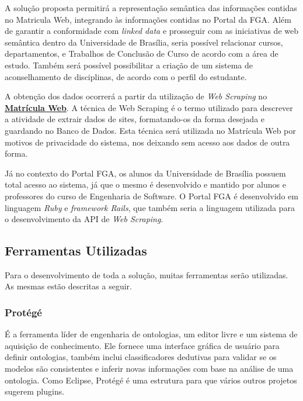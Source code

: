 
A solução proposta permitirá a representação semântica das informações contidas no Matricula Web, integrando às informações contidas no Portal da FGA. Além de garantir a conformidade com \textit{linked data} e prosseguir com as iniciativas de web semântica dentro da Universidade de Brasília, seria possível relacionar cursos, departamentos, e Trabalhos de Conclusão de Curso de acordo com a área de estudo. Também será possível possibilitar a criação de um sistema de aconselhamento de disciplinas, de acordo com o perfil do estudante.

A obtenção dos dados ocorrerá a partir da utilização de \textit{Web Scraping} no \href{http://matriculaweb.unb.br}{\textbf{Matrícula Web}}. A técnica de Web Scraping é o termo utilizado para descrever a atividade de extrair dados de sites, formatando-os da forma desejada e guardando no Banco de Dados. Esta técnica será utilizada no Matrícula Web por motivos de privacidade do sistema, nos deixando sem acesso aos dados de outra forma.

Já no contexto do Portal FGA, os alunos da Universidade de Brasília possuem total acesso ao sistema, já que o mesmo é desenvolvido e mantido por alunos e professores do curso de Engenharia de Software. O Portal FGA é desenvolvido em linguagem \textit{Ruby} e \textit{framework Rails}, que também seria a linguagem utilizada para o desenvolvimento da API de \textit{Web Scraping}.

\subsection{Ferramentas Utilizadas} %
\label{sub:ferramentas_utilizadas}
	
	Para o desenvolvimento de toda a solução, muitas ferramentas serão utilizadas. As mesmas estão descritas a seguir.

\subsubsection{Protégé}

	É a ferramenta líder de engenharia de ontologias, um editor livre e um sistema de aquisição de conhecimento. Ele fornece uma interface gráfica de usuário para definir ontologias, também inclui classificadores dedutivas para validar se os modelos são consistentes e inferir novas informações com base na análise de uma ontologia. Como Eclipse, Protégé é uma estrutura para que vários outros projetos sugerem plugins. 

